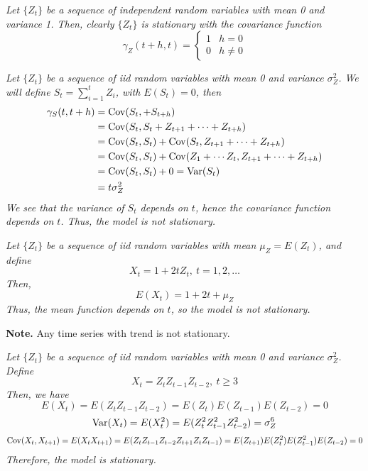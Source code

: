 \begin{example}
    \emph{
        Let $\{Z_t\}$ be a sequence of independent random variables with mean 0 and variance 1. Then, clearly $\{Z_t\}$ is stationary with the covariance function 
        \[\gamma_Z(t+h, t) = \begin{cases}
            1 & h = 0\\
            0 & h \neq 0
        \end{cases}\]
    }
\end{example}
\begin{example}
    \emph{
        Let $\{Z_t\}$ be a sequence of iid random variables with mean 0 and variance $\sigma_Z^2$. We will define $S_t = \sum_{i=1}^t Z_i$, with $E(S_t) = 0$, then 
        }
        \begin{align*}
            \gamma_S(t,t+h) &= \operatorname{Cov}(S_t, + S_{t+h}) \\
            &= \operatorname{Cov}(S_t, S_t + Z_{t+1} + \cdots + Z_{t+h}) \\
            &= \operatorname{Cov}(S_t,S_t) + \operatorname{Cov}(S_t, Z_{t+1} + \cdots + Z_{t+h}) \\
            &= \operatorname{Cov}(S_t,S_t) + \operatorname{Cov}(Z_1 + \cdots Z_t, Z_{t+1} + \cdots + Z_{t+h}) \\
            &= \operatorname{Cov}(S_t, S_t) + 0 = \operatorname{Var}(S_t)\\
            &= t\sigma_Z^2
        \end{align*}
        \emph{
            We see that the variance of $S_t$ depends on $t$, hence the covariance function depends on $t$. Thus, the model is not stationary.
        }
\end{example}

\begin{example}
    \emph{
        Let $\{Z_t\}$ be a sequence of iid random variables with mean $\mu_Z = E(Z_t)$, and define 
        \[X_t = 1 + 2t Z_t, \ t = 1,2,\ldots\]
        Then,
        \[E(X_t) = 1 + 2t + \mu_Z\]
        Thus, the mean function depends on $t$, so the model is not stationary.
    }
\end{example}

\noindent
\textbf{Note.} Any time series with trend is not stationary.

\begin{example}
    \emph{
        Let $\{Z_t\}$ be a sequence of iid random variables with mean 0 and variance $\sigma_Z^2$. Define 
        \[X_t = Z_tZ_{t-1}Z_{t-2}, \ t \geq 3\]
        Then, we have 
        \[E(X_t) = E(Z_tZ_{t-1}Z_{t-2}) = E(Z_t)E(Z_{t-1})E(Z_{t-2}) = 0\]
        \[\operatorname{Var}(X_t) = E(X_t^2) = E(Z_t^2Z_{t-1}^2Z_{t-2}^2) = \sigma_Z^6\]
        \[\operatorname{Cov}(X_t,X_{t+1}) = E(X_tX_{t+1}) = E({Z_tZ_{t-1}Z_{t-2}}{Z_{t+1}Z_tZ_{t-1}}) = E(Z_{t+1})E(Z_t^2)E(Z_{t-1}^2)E(Z_{t-2}) = 0\]
        Therefore, the model is stationary.
        }    
\end{example}

